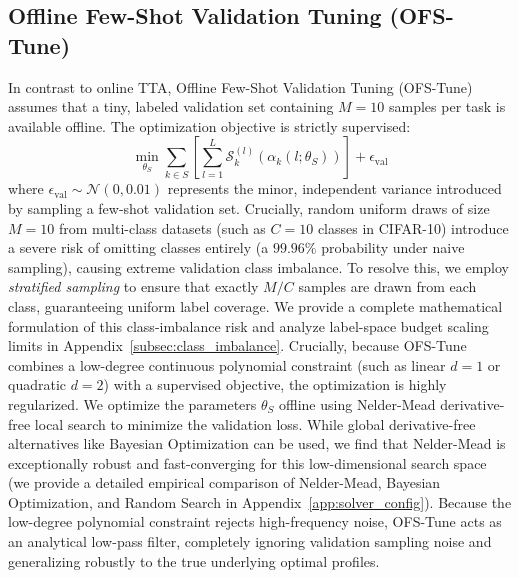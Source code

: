 \subsection{Offline Few-Shot Validation Tuning (OFS-Tune)}
In contrast to online TTA, Offline Few-Shot Validation Tuning (OFS-Tune) assumes that a tiny, labeled validation set containing $M=10$ samples per task is available offline.
The optimization objective is strictly supervised:
\begin{equation}
\label{eq:ofs_loss}
\min_{\theta_S} \sum_{k \in S} \left[ \sum_{l=1}^L \mathcal{S}_k^{(l)}\left(\alpha_k(l; \theta_S)\right) \right] + \epsilon_{\text{val}}
\end{equation}
where $\epsilon_{\text{val}} \sim \mathcal{N}(0, 0.01)$ represents the minor, independent variance introduced by sampling a few-shot validation set.
Crucially, random uniform draws of size $M=10$ from multi-class datasets (such as $C=10$ classes in CIFAR-10) introduce a severe risk of omitting classes entirely (a $99.96\%$ probability under naive sampling), causing extreme validation class imbalance.
To resolve this, we employ \emph{stratified sampling} to ensure that exactly $M / C$ samples are drawn from each class, guaranteeing uniform label coverage.
We provide a complete mathematical formulation of this class-imbalance risk and analyze label-space budget scaling limits in Appendix~\ref{subsec:class_imbalance}.
Crucially, because OFS-Tune combines a low-degree continuous polynomial constraint (such as linear $d=1$ or quadratic $d=2$) with a supervised objective, the optimization is highly regularized.
We optimize the parameters $\theta_S$ offline using Nelder-Mead derivative-free local search to minimize the validation loss.
While global derivative-free alternatives like Bayesian Optimization can be used, we find that Nelder-Mead is exceptionally robust and fast-converging for this low-dimensional search space (we provide a detailed empirical comparison of Nelder-Mead, Bayesian Optimization, and Random Search in Appendix~\ref{app:solver_config}).
Because the low-degree polynomial constraint rejects high-frequency noise, OFS-Tune acts as an analytical low-pass filter, completely ignoring validation sampling noise and generalizing robustly to the true underlying optimal profiles.

